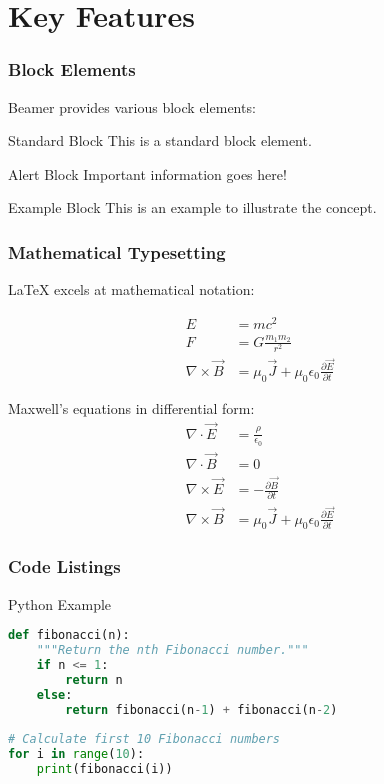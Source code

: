 \documentclass{beamer}
\begin{document}
\section{Key Features}

\begin{frame}
  \frametitle{Block Elements}
  
  Beamer provides various block elements:
  
  \begin{block}{Standard Block}
    This is a standard block element.
  \end{block}
  
  \begin{alertblock}{Alert Block}
    Important information goes here!
  \end{alertblock}
  
  \begin{exampleblock}{Example Block}
    This is an example to illustrate the concept.
  \end{exampleblock}
\end{frame}

\begin{frame}
  \frametitle{Mathematical Typesetting}
  
  \LaTeX{} excels at mathematical notation:
  
  \begin{align}
    E &= mc^2\\
    F &= G\frac{m_1 m_2}{r^2}\\
    \nabla \times \vec{B} &= \mu_0\vec{J} + \mu_0\epsilon_0\frac{\partial \vec{E}}{\partial t}
  \end{align}
  
  Maxwell's equations in differential form:
  \begin{align}
    \nabla \cdot \vec{E} &= \frac{\rho}{\epsilon_0}\\
    \nabla \cdot \vec{B} &= 0\\
    \nabla \times \vec{E} &= -\frac{\partial \vec{B}}{\partial t}\\
    \nabla \times \vec{B} &= \mu_0\vec{J} + \mu_0\epsilon_0\frac{\partial \vec{E}}{\partial t}
  \end{align}
\end{frame}

\begin{frame}[fragile]
  \frametitle{Code Listings}
  
  \begin{block}{Python Example}
    \begin{lstlisting}[language=Python]
def fibonacci(n):
    """Return the nth Fibonacci number."""
    if n <= 1:
        return n
    else:
        return fibonacci(n-1) + fibonacci(n-2)
        
# Calculate first 10 Fibonacci numbers
for i in range(10):
    print(fibonacci(i))
    \end{lstlisting}
  \end{block}
\end{frame}
\end{document}

